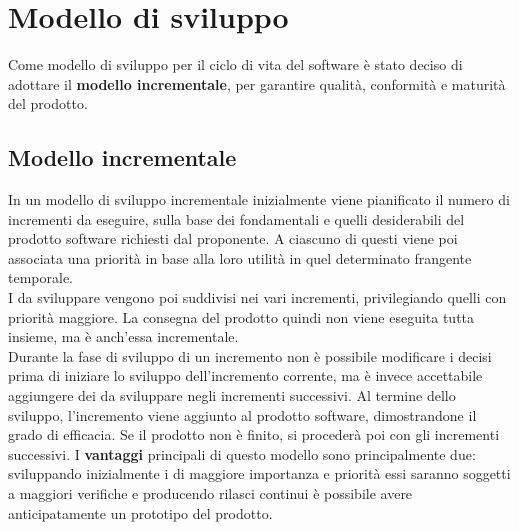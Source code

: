 \documentclass[PianoDiProgetto.tex]{subfiles}
\begin{document}
\chapter{Modello di sviluppo}
Come modello di sviluppo per il ciclo di vita del software è stato deciso di adottare il \textbf{modello incrementale}, per garantire qualità, conformità e maturità del prodotto.

\section{Modello incrementale}
In un modello di sviluppo incrementale inizialmente viene pianificato il numero di incrementi da eseguire, sulla base dei  fondamentali e quelli desiderabili del prodotto software richiesti dal proponente. A ciascuno di questi viene poi associata una priorità in base alla loro utilità in quel determinato frangente temporale.\\
I  da sviluppare vengono poi suddivisi nei vari incrementi, privilegiando quelli con priorità maggiore. La consegna del prodotto quindi non viene eseguita tutta insieme, ma è anch'essa incrementale.\\
Durante la fase di sviluppo di un incremento non è possibile modificare i  decisi prima di iniziare lo sviluppo dell'incremento corrente, ma è invece accettabile aggiungere dei  da sviluppare negli incrementi successivi. Al termine dello sviluppo, l'incremento viene aggiunto al prodotto software, dimostrandone il grado di efficacia. Se il prodotto non è finito, si procederà poi con gli incrementi successivi. I \textbf{vantaggi} principali di questo modello sono principalmente due: sviluppando inizialmente i  di maggiore importanza e priorità essi saranno soggetti a maggiori verifiche e producendo rilasci continui è possibile avere anticipatamente un prototipo del prodotto.
\end{document}
